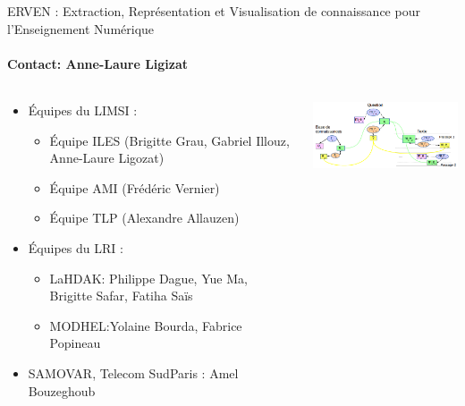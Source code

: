 \begin{frame}{ERVEN : Extraction, Représentation et Visualisation de connaissance pour
l'Enseignement Numérique}
\framesubtitle{Contact: Anne-Laure Ligizat}
  \begin{columns}
    \begin{column}{7cm}
      \hspace*{-1cm}
      \begin{itemize}
        \item Équipes du LIMSI :
          \begin{itemize}
          \item
            Équipe ILES (Brigitte Grau, Gabriel Illouz, Anne-Laure Ligozat)
          \item
            Équipe AMI (Frédéric Vernier)
          \item
            Équipe TLP (Alexandre Allauzen) 
          \end{itemize}
       \item Équipes du LRI : 
         \begin{itemize}
           \item LaHDAK: Philippe Dague,
         Yue Ma, Brigitte Safar, Fatiha Saïs 
         \item MODHEL:Yolaine Bourda, Fabrice Popineau
           \end{itemize}
      \item SAMOVAR, Telecom SudParis :
        Amel Bouzeghoub 
    \end{itemize}
  \end{column}
       \begin{column}{6cm}
         \includegraphics[width=6cm]{Images/education.png}
       \end{column}
\end{columns}

\flushleft
{}
\end{frame}

